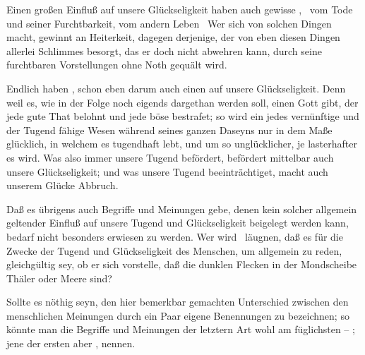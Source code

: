 \begin{aufza}
\begin{aufzb}
\item Einen großen Einfluß auf unsere Glückseligkeit haben auch gewisse , \zB\ vom Tode und seiner Furchtbarkeit, vom andern Leben \usw\ Wer sich von solchen Dingen  macht, gewinnt an Heiterkeit, dagegen derjenige, der von eben diesen Dingen allerlei Schlimmes besorgt, das er doch nicht abwehren kann, durch seine furchtbaren Vorstellungen ohne Noth gequält wird.
\item Endlich haben , schon eben darum auch einen  auf unsere Glückseligkeit. Denn weil es, wie in der Folge noch eigends dargethan werden soll, einen Gott gibt, der jede gute That belohnt und jede böse bestrafet; so wird ein jedes vernünftige und der Tugend fähige Wesen während seines ganzen Daseyns nur in dem Maße glücklich, in welchem es tugendhaft lebt, und um so unglücklicher, je lasterhafter es wird. Was also immer unsere Tugend befördert, befördert mittelbar auch unsere Glückseligkeit; und was unsere Tugend beeinträchtiget, macht auch unserem Glücke Abbruch.
\end{aufzb}
\item  Daß es übrigens auch Begriffe und Meinungen gebe, denen kein solcher allgemein geltender Einfluß auf unsere Tugend und Glückseligkeit beigelegt werden kann, bedarf nicht besonders erwiesen zu werden. Wer wird \zB\ läugnen, daß es für die Zwecke der Tugend und Glückseligkeit des Menschen, um allgemein zu reden, gleichgültig sey, ob er sich vorstelle, daß die dunklen Flecken in der Mondscheibe Thäler oder Meere sind? \udgl
\item Sollte es nöthig seyn, den hier bemerkbar gemachten Unterschied zwischen den menschlichen Meinungen durch ein Paar eigene Benennungen zu bezeichnen; so könnte man die Begriffe und Meinungen der letztern Art wohl am füglichsten -- ; jene der ersten aber ,  nennen.
\end{aufza}

